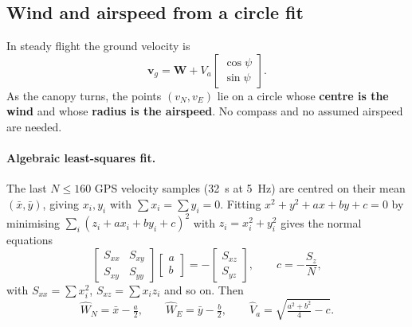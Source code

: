 \documentclass[11pt,a4paper]{article}
\newcommand{\vect}[1]{\mathbf{#1}}
\begin{document}
\subsection{Wind and airspeed from a circle fit}
\label{sec:wind}
In steady flight the ground velocity is
\begin{equation}
  \vect v_g = \vect W + V_a \begin{bmatrix}\cos\psi\\ \sin\psi\end{bmatrix}.
\end{equation}
As the canopy turns, the points $(v_N, v_E)$ lie on a circle whose
\textbf{centre is the wind} and whose \textbf{radius is the airspeed}. No
compass and no assumed airspeed are needed.

\paragraph{Algebraic least-squares fit.} The last $N \le 160$ GPS velocity
samples (\SI{32}{\second} at \SI{5}{\hertz}) are centred on their mean
$(\bar x, \bar y)$, giving $x_i, y_i$ with $\sum x_i = \sum y_i = 0$. Fitting
$x^2 + y^2 + a x + b y + c = 0$ by minimising
$\sum_i (z_i + a x_i + b y_i + c)^2$ with $z_i = x_i^2 + y_i^2$ gives the
normal equations
\begin{equation}
  \begin{bmatrix} S_{xx} & S_{xy}\\ S_{xy} & S_{yy}\end{bmatrix}
  \begin{bmatrix} a\\ b\end{bmatrix}
  = -\begin{bmatrix} S_{xz}\\ S_{yz}\end{bmatrix},
  \qquad c = -\frac{S_z}{N},
\end{equation}
with $S_{xx} = \sum x_i^2$, $S_{xz} = \sum x_i z_i$ and so on. Then
\begin{equation}
  \hat W_N = \bar x - \tfrac{a}{2}, \qquad \hat W_E = \bar y - \tfrac{b}{2}, \qquad
  \hat V_a = \sqrt{\tfrac{a^2 + b^2}{4} - c}.
\end{equation}
\end{document}
